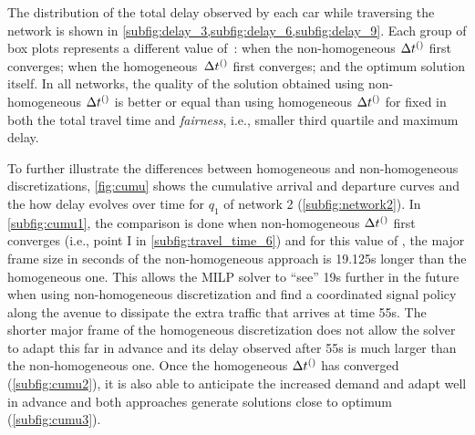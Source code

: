 The distribution of the total delay observed by each car while traversing the
network is shown in \cref{subfig:delay_3,subfig:delay_6,subfig:delay_9}.
%
Each group of box plots represents a different value of~\Nn: when the
non-homogeneous $\DT[]$ first converges; when the homogeneous~$\DT[]$ first
converges; and the optimum solution itself.
%
In all networks, the quality of the solution obtained using non-homogeneous
$\DT[]$ is better or equal than using homogeneous $\DT[]$ for fixed \Nn in both
the total travel time and \emph{fairness}, i.e., smaller third quartile and
maximum delay.



\begin{figure*}[t!]
\centering

%
\caption{Cumulative arrival and departure curves and delay for queue 1 in the
2-by-3 network (\cref{subfig:network2}).
%
The value of \Nn in plots (a) and (b) corresponds, respectively, to the
convergence point of the non-homogeneous and homogeneous approaches
(\cref{subfig:travel_time_6}).
%
(c)~presents the same curves for the optimal solution.}
%
\label{fig:cumu}
\end{figure*}


To further illustrate the differences between homogeneous and non-homogeneous
discretizations, \cref{fig:cumu} shows the cumulative arrival and departure
curves and the how delay evolves over time for $q_1$ of network 2
(\cref{subfig:network2}).
%
In \cref{subfig:cumu1}, the comparison is done when non-homogeneous $\DT[]$
first converges (i.e., point I in \cref{subfig:travel_time_6}) and for this
value of \Nn, the major frame size in seconds of the non-homogeneous approach is
19.125s longer than the homogeneous one.
%
This allows the MILP solver to ``see'' 19s further in the future when using
non-homogeneous discretization and find a coordinated signal policy along the
avenue to dissipate the extra traffic that arrives at time 55s.
%
The shorter major frame of the homogeneous discretization does not allow the
solver to adapt this far in advance and its delay observed after 55s is much
larger than the non-homogeneous one.
%
Once the homogeneous $\DT[]$ has converged (\cref{subfig:cumu2}), it is also
able to anticipate the increased demand and adapt well in advance and both
approaches generate solutions close to optimum (\cref{subfig:cumu3}).
